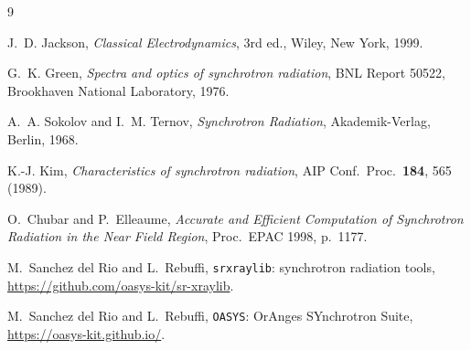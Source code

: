 \documentclass[11pt,a4paper]{article}
\begin{document}
\begin{thebibliography}{9}

J.~D. Jackson,
\textit{Classical Electrodynamics}, 3rd ed.,
Wiley, New York, 1999.

G.~K. Green,
\textit{Spectra and optics of synchrotron radiation},
BNL Report 50522, Brookhaven National Laboratory, 1976.

A.~A. Sokolov and I.~M. Ternov,
\textit{Synchrotron Radiation},
Akademik-Verlag, Berlin, 1968.

K.-J. Kim,
\textit{Characteristics of synchrotron radiation},
AIP Conf.\ Proc.\ \textbf{184}, 565 (1989).

O.~Chubar and P.~Elleaume,
\textit{Accurate and Efficient Computation of Synchrotron Radiation in the Near Field Region},
Proc.\ EPAC 1998, p.~1177.

M.~Sanchez del Rio and L.~Rebuffi,
\texttt{srxraylib}: synchrotron radiation tools,
\url{https://github.com/oasys-kit/sr-xraylib}.

M.~Sanchez del Rio and L.~Rebuffi,
\texttt{OASYS}: OrAnges SYnchrotron Suite,
\url{https://oasys-kit.github.io/}.

\end{thebibliography}
\end{document}
